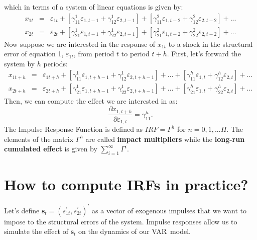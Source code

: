\documentclass[11pt,a4paper]{report}
\numberwithin{equation}{chapter}
\numberwithin{section}{chapter}
\begin{document}
which in terms of a system of linear equations is given by:%
\begin{eqnarray*}
x_{1t} &=&\varepsilon _{1t}+[\gamma _{11}^{1}\varepsilon _{1,t-1}+\gamma
_{12}^{1}\varepsilon _{2,t-1}]+[\gamma _{11}^{2}\varepsilon _{1,t-2}+\gamma
_{12}^{2}\varepsilon _{2,t-2}]+... \\
x_{2t} &=&\varepsilon _{2t}+[\gamma _{21}^{1}\varepsilon _{1,t-1}+\gamma
_{22}^{1}\varepsilon _{2,t-1}]+[\gamma _{21}^{2}\varepsilon _{1,t-2}+\gamma
_{22}^{2}\varepsilon _{2,t-2}]+...
\end{eqnarray*}%
Now suppose we are interested in the response of $x_{1t}$ to a shock in the
structural error of equation 1, $\varepsilon _{1t}$, from period $t$ to
period $t+h$. First, let's forward the system by $h$ periods:%
\begin{eqnarray*}
x_{1t+h} &=&\varepsilon _{1t+h}+[\gamma _{11}^{1}\varepsilon
_{1,t+h-1}+\gamma _{12}^{1}\varepsilon _{2,t+h-1}]+...+[\gamma
_{11}^{h}\varepsilon _{1,t}+\gamma _{12}^{h}\varepsilon _{2,t}]+... \\
x_{2t+h} &=&\varepsilon _{2t+h}+[\gamma _{21}^{1}\varepsilon
_{1,t+h-1}+\gamma _{22}^{1}\varepsilon _{2,t+h-1}]+...+[\gamma
_{21}^{h}\varepsilon _{1,t}+\gamma _{22}^{h}\varepsilon _{2,t}]+...
\end{eqnarray*}%
Then, we can compute the effect we are interested in as:%
\begin{equation*}
\frac{\partial x_{1,t+h}}{\partial \varepsilon _{1,t}}=\gamma _{11}^{h}.
\end{equation*}%
The Impulse Response Function is defined as $IRF=\Gamma ^{h}$ for $%
n=0,1,...H $. The elements of the matrix $\Gamma ^{h}$ are called \textbf{%
impact multipliers} while the \textbf{long-run cumulated effect} is given by 
$\sum_{i=1}^{\infty }\Gamma ^{i}$.

\section{How to compute IRFs in practice?}

Let's define $\mathbf{s}_{t}=\left( s_{1t}^{\prime },s_{2t}^{\prime }\right)
^{\prime }$ as a vector of exogenous impulses that we want to impose to the
structural errors of the system. Impulse responses allow us to simulate the
effect of $\mathbf{s}_{t}$ on the dynamics of our VAR\ model.
\end{document}
